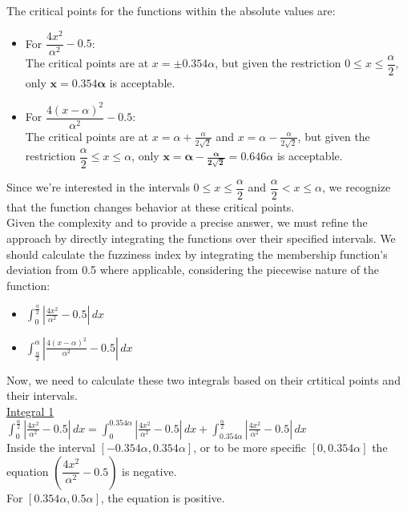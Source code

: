 The critical points for the functions within the absolute values are:
\begin{itemize}
	\item For $\dfrac{4x^2}{\alpha^2} - 0.5$:\\
		The critical points are at $x = \pm 0.354\alpha$, but given the restriction $0 \leq x \leq \dfrac{\alpha}{2}$, only $\mathbf{x = 0.354\alpha}$ is acceptable.
	
	\item  For $\dfrac{4(x-\alpha)^2}{\alpha^2} - 0.5$:\\
		The critical points are at $x = \alpha + \frac{\alpha}{2\sqrt{2}}$ and $x = \alpha - \frac{\alpha}{2\sqrt{2}}$, but given the restriction $\dfrac{\alpha}{2} \leq x \leq \alpha$, only $\mathbf{x = \alpha - \frac{\alpha}{2\sqrt{2}}} = 0.646\alpha$ is acceptable.
\end{itemize}
Since we're interested in the intervals $0 \leq x \leq \dfrac{\alpha}{2}$ and $\dfrac{\alpha}{2} < x \leq \alpha$, we recognize that the function changes behavior at these critical points. \\

Given the complexity and to provide a precise answer, we must refine the approach by directly integrating the functions over their specified intervals. We should calculate the fuzziness index by integrating the membership function's deviation from 0.5 where applicable, considering the piecewise nature of the function:
\begin{itemize}
	\item $\displaystyle \int_{0}^{\frac{\alpha}{2}} \left| \frac{4x^2}{\alpha^2} - 0.5 \right| \, dx$
	\item $\displaystyle \int_{\frac{\alpha}{2}}^{\alpha} \left| \frac{4(x-\alpha)^2}{\alpha^2} - 0.5 \right| \, dx$	
\end{itemize}

Now, we need to calculate these two integrals based on their crtitical points and their intervals.\\

\underline{Integral 1}\\

$\displaystyle \int_{0}^{\frac{\alpha}{2}} \left| \frac{4x^2}{\alpha^2} - 0.5 \right| \, dx = \displaystyle \int_{0}^{0.354\alpha} \left| \frac{4x^2}{\alpha^2} - 0.5 \right| \, dx+ \int_{0.354\alpha}^{\frac{\alpha}{2}} \left|\frac{4x^2}{\alpha^2} - 0.5\right| \, dx$
\\

Inside the interval $[-0.354\alpha, 0.354\alpha]$, or to be more specific $[0, 0.354\alpha]$ the equation $\left(\dfrac{4x^2}{\alpha^2} - 0.5\right)$ is negative.\\
For $[0.354\alpha, 0.5\alpha]$, the equation is positive.\\

